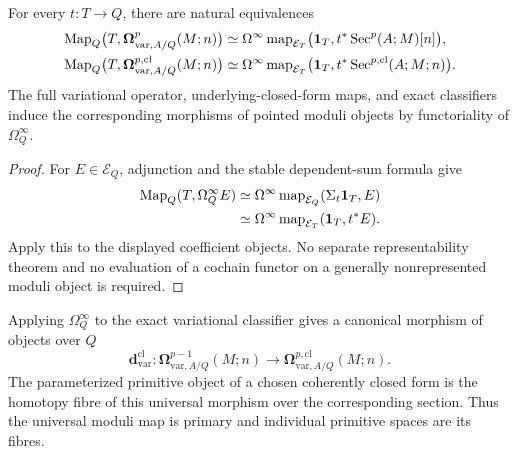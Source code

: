 \begin{proposition}
\label{prop:var-moduli-representing}
For every \(t:T\to Q\), there are natural equivalences
\[
\begin{aligned}
    \operatorname{Map}_Q\bigl(T,\boldsymbol\Omega^p_{\mathrm{var},A/Q}(M;n)\bigr)
    &\simeq
    \Omega^\infty
    \operatorname{map}_{\mathcal E_T}
    \bigl(\mathbf 1_T,t^*\operatorname{Sec}^p(A;M)[n]\bigr),
    \\
    \operatorname{Map}_Q\bigl(T,\boldsymbol\Omega^{p,\mathrm{cl}}_{\mathrm{var},A/Q}(M;n)\bigr)
    &\simeq
    \Omega^\infty
    \operatorname{map}_{\mathcal E_T}
    \bigl(\mathbf 1_T,t^*\operatorname{Sec}^{p,\mathrm{cl}}(A;M;n)\bigr).
\end{aligned}
\]
The full variational operator, underlying-closed-form maps, and exact classifiers induce the corresponding morphisms of pointed moduli objects by functoriality of \(\Omega_Q^\infty\).
\end{proposition}

\begin{proof}
For \(E\in\mathcal E_Q\), adjunction and the stable dependent-sum formula give
\[
\begin{aligned}
    \operatorname{Map}_Q(T,\Omega_Q^\infty E)
    &\simeq
    \Omega^\infty
    \operatorname{map}_{\mathcal E_Q}(\Sigma_t\mathbf 1_T,E)\\
    &\simeq
    \Omega^\infty
    \operatorname{map}_{\mathcal E_T}(\mathbf 1_T,t^*E).
\end{aligned}
\]
Apply this to the displayed coefficient objects. No separate representability theorem and no evaluation of a cochain functor on a generally nonrepresented moduli object is required.
\end{proof}

\begin{construction}
\label{con:var-universal-primitive-map}
Applying \(\Omega_Q^\infty\) to the exact variational classifier gives a canonical morphism of objects over \(Q\)
\[
    \boxed{
    \mathbf d^{\mathrm{cl}}_{\mathrm{var}}:
    \boldsymbol\Omega^{p-1}_{\mathrm{var},A/Q}(M;n)
    \longrightarrow
    \boldsymbol\Omega^{p,\mathrm{cl}}_{\mathrm{var},A/Q}(M;n).
    }
\]
The parameterized primitive object of a chosen coherently closed form is the homotopy fibre of this universal morphism over the corresponding section. Thus the universal moduli map is primary and individual primitive spaces are its fibres.
\end{construction}

